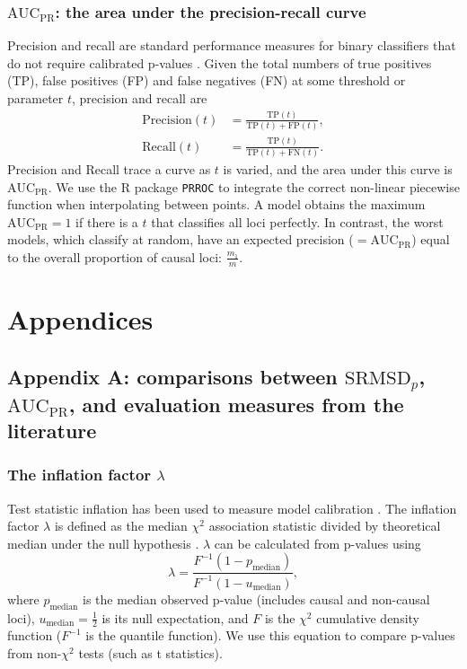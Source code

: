 \documentclass[11pt]{article}
\newcommand{\rmsd}{\text{SRMSD}_p}
\newcommand{\auc}{\text{AUC}_\text{PR}}
\begin{document}
\subsubsection{$\auc$: the area under the precision-recall curve}

Precision and recall are standard performance measures for binary classifiers that do not require calibrated p-values \citep{grau_prroc:_2015}.
Given the total numbers of true positives (TP), false positives (FP) and false negatives (FN) at some threshold or parameter $t$, precision and recall are
\begin{align*}
  \text{Precision}(t)
  &=
    \frac{ \text{TP}(t) }{ \text{TP}(t) + \text{FP}(t) }
    , \\
  \text{Recall}(t)
  &=
    \frac{ \text{TP}(t) }{ \text{TP}(t) + \text{FN}(t) }
    .
\end{align*}
Precision and Recall trace a curve as $t$ is varied, and the area under this curve is $\auc$.
We use the R package \texttt{PRROC} to integrate the correct non-linear piecewise function when interpolating between points.
A model obtains the maximum $\auc = 1$ if there is a $t$ that classifies all loci perfectly.
In contrast, the worst models, which classify at random, have an expected precision ($= \auc$) equal to the overall proportion of causal loci:
$\frac{m_1}{m}$.


\section{Appendices}

\subsection{Appendix A: comparisons between $\rmsd$, $\auc$, and evaluation measures from the literature}

\subsubsection{The inflation factor $\lambda$}

Test statistic inflation has been used to measure model calibration \citep{astle_population_2009, price_new_2010}.
The inflation factor $\lambda$ is defined as the median $\chi^2$ association statistic divided by theoretical median under the null hypothesis \citep{devlin_genomic_1999}.
$\lambda$ can be calculated from p-values using
$$
\lambda
=
\frac{
  F^{-1} \left( 1 - p_\text{median} \right)
}{
  F^{-1} \left( 1 - u_\text{median} \right)
}
,
$$
where $p_\text{median}$ is the median observed p-value (includes causal and non-causal loci),
$u_\text{median} = \frac{1}{2}$ is its null expectation,
and $F$ is the $\chi^2$ cumulative density function ($F^{-1}$ is the quantile function).
We use this equation to compare p-values from non-$\chi^2$ tests (such as t statistics).
\end{document}
